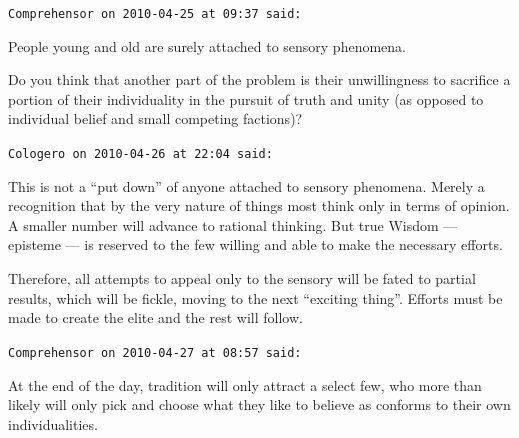 \begin{footnotesize}
\begin{sffamily}
\texttt{Comprehensor on 2010-04-25 at 09:37 said:}

People young and old are surely attached to sensory phenomena.

Do you think that another part of the problem is their unwillingness to sacrifice a portion of their individuality in the pursuit of truth and unity (as opposed to individual belief and small competing factions)?

\hfill

\texttt{Cologero on 2010-04-26 at 22:04 said:}

This is not a ``put down'' of anyone attached to sensory phenomena. Merely a recognition that by the very nature of things most think only in terms of opinion. A smaller number will advance to rational thinking. But true Wisdom --- episteme --- is reserved to the few willing and able to make the necessary efforts.

Therefore, all attempts to appeal only to the sensory will be fated to partial results, which will be fickle, moving to the next ``exciting thing''. Efforts must be made to create the elite and the rest will follow.

\hfill

\texttt{Comprehensor on 2010-04-27 at 08:57 said:}

At the end of the day, tradition will only attract a select few, who more than likely will only pick and choose what they like to believe as conforms to their own individualities.

\end{sffamily}
\end{footnotesize}

